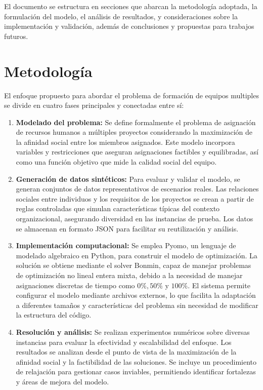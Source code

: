 \documentclass[conference]{IEEEtran}
\begin{document}
El documento se estructura en secciones que abarcan la metodología adoptada, la formulación del modelo, el análisis de resultados, y consideraciones sobre la implementación y validación, además de conclusiones y propuestas para trabajos futuros.

\section{Metodología}

El enfoque propuesto para abordar el problema de formación de equipos multiples se divide en cuatro fases principales y conectadas entre sí:

\begin{enumerate}
    \item \textbf{Modelado del problema:} Se define formalmente el problema de asignación de recursos humanos a múltiples proyectos considerando la maximización de la afinidad social entre los miembros asignados. Este modelo incorpora variables y restricciones que aseguran asignaciones factibles y equilibradas, así como una función objetivo que mide la calidad social del equipo.

    \item \textbf{Generación de datos sintéticos:} Para evaluar y validar el modelo, se generan conjuntos de datos representativos de escenarios reales. Las relaciones sociales entre individuos y los requisitos de los proyectos se crean a partir de reglas controladas que simulan características típicas del contexto organizacional, asegurando diversidad en las instancias de prueba. Los datos se almacenan en formato JSON para facilitar su reutilización y análisis.

    \item \textbf{Implementación computacional:} Se emplea Pyomo\cite{pyomo_hart2011}, un lenguaje de modelado algebraico en Python, para construir el modelo de optimización. La solución se obtiene mediante el solver Bonmin\cite{bonmin_bonami2008}, capaz de manejar problemas de optimización no lineal entera mixta, debido a la necesidad de manejar asignaciones discretas de tiempo como \(0\%, 50\% \text{ y } 100\%\). El sistema permite configurar el modelo mediante archivos externos, lo que facilita la adaptación a diferentes tamaños y características del problema sin necesidad de modificar la estructura del código.

    \item \textbf{Resolución y análisis:} Se realizan experimentos numéricos sobre diversas instancias para evaluar la efectividad y escalabilidad del enfoque. Los resultados se analizan desde el punto de vista de la maximización de la afinidad social y la factibilidad de las soluciones. Se incluye un procedimiento de relajación para gestionar casos inviables, permitiendo identificar fortalezas y áreas de mejora del modelo.
\end{enumerate}
\end{document}
